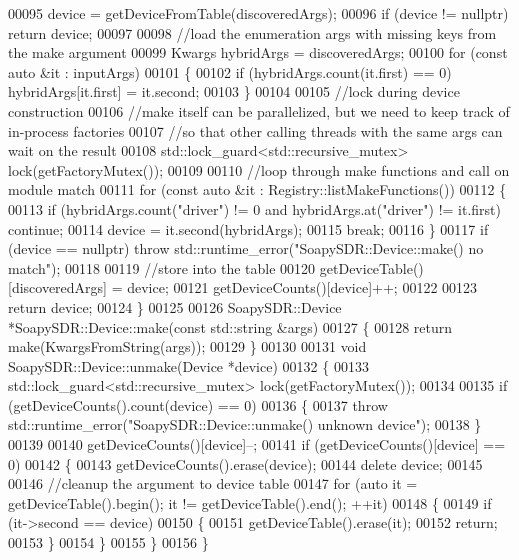 \begin{DoxyCode}
00095     device = getDeviceFromTable(discoveredArgs);
00096     \textcolor{keywordflow}{if} (device != \textcolor{keyword}{nullptr}) \textcolor{keywordflow}{return} device;
00097 
00098     \textcolor{comment}{//load the enumeration args with missing keys from the make argument}
00099     Kwargs hybridArgs = discoveredArgs;
00100     \textcolor{keywordflow}{for} (\textcolor{keyword}{const} \textcolor{keyword}{auto} &it : inputArgs)
00101     \{
00102         \textcolor{keywordflow}{if} (hybridArgs.count(it.first) == 0) hybridArgs[it.first] = it.second;
00103     \}
00104 
00105     \textcolor{comment}{//lock during device construction}
00106     \textcolor{comment}{//make itself can be parallelized, but we need to keep track of in-process factories}
00107     \textcolor{comment}{//so that other calling threads with the same args can wait on the result}
00108     std::lock\_guard<std::recursive\_mutex> lock(getFactoryMutex());
00109 
00110     \textcolor{comment}{//loop through make functions and call on module match}
00111     \textcolor{keywordflow}{for} (\textcolor{keyword}{const} \textcolor{keyword}{auto} &it : Registry::listMakeFunctions())
00112     \{
00113         \textcolor{keywordflow}{if} (hybridArgs.count(\textcolor{stringliteral}{"driver"}) != 0 and hybridArgs.at(\textcolor{stringliteral}{"driver"}) != it.first) \textcolor{keywordflow}{continue};
00114         device = it.second(hybridArgs);
00115         \textcolor{keywordflow}{break};
00116     \}
00117     \textcolor{keywordflow}{if} (device == \textcolor{keyword}{nullptr}) \textcolor{keywordflow}{throw} std::runtime\_error(\textcolor{stringliteral}{"SoapySDR::Device::make() no match"});
00118 
00119     \textcolor{comment}{//store into the table}
00120     getDeviceTable()[discoveredArgs] = device;
00121     getDeviceCounts()[device]++;
00122 
00123     \textcolor{keywordflow}{return} device;
00124 \}
00125 
00126 SoapySDR::Device *SoapySDR::Device::make(\textcolor{keyword}{const} std::string &args)
00127 \{
00128     \textcolor{keywordflow}{return} make(KwargsFromString(args));
00129 \}
00130 
00131 \textcolor{keywordtype}{void} SoapySDR::Device::unmake(Device *device)
00132 \{
00133     std::lock\_guard<std::recursive\_mutex> lock(getFactoryMutex());
00134 
00135     \textcolor{keywordflow}{if} (getDeviceCounts().count(device) == 0)
00136     \{
00137         \textcolor{keywordflow}{throw} std::runtime\_error(\textcolor{stringliteral}{"SoapySDR::Device::unmake() unknown device"});
00138     \}
00139 
00140     getDeviceCounts()[device]--;
00141     \textcolor{keywordflow}{if} (getDeviceCounts()[device] == 0)
00142     \{
00143         getDeviceCounts().erase(device);
00144         \textcolor{keyword}{delete} device;
00145 
00146         \textcolor{comment}{//cleanup the argument to device table}
00147         \textcolor{keywordflow}{for} (\textcolor{keyword}{auto} it = getDeviceTable().begin(); it != getDeviceTable().end(); ++it)
00148         \{
00149             \textcolor{keywordflow}{if} (it->second == device)
00150             \{
00151                 getDeviceTable().erase(it);
00152                 \textcolor{keywordflow}{return};
00153             \}
00154         \}
00155     \}
00156 \}
\end{DoxyCode}
